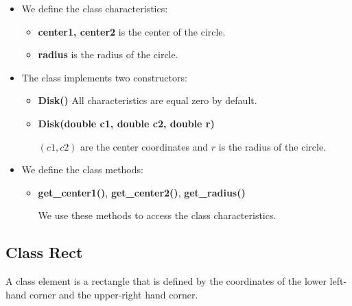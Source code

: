 \documentclass{report}
\begin{document}
	\begin{itemize}
		\item We define the class characteristics: 
		\begin{itemize}
			\item {\bfseries center1, center2}  is the center of the circle.
		
			\item {\bfseries radius}  is  the radius of the circle.
		\end{itemize}
	
		\item The class implements two constructors:
		\begin{itemize}
			\item {\bfseries Disk()} All characteristics are equal zero by default. 
		
			\item {\bfseries Disk(double c1, double c2, double r)}
		
			$(c1, c2)$ are the center coordinates and $r$ is  the radius of the circle. 
		\end{itemize}
	
		\item We define the class methods:
	
		\begin{itemize}
			\item {\bfseries get\_center1()}, {\bfseries get\_center2()}, {\bfseries get\_radius()}
			
			We use these  methods to access the class characteristics.
		\end{itemize}
	\end{itemize}
	
	\subsection*{Class Rect}
	\label{Rect}
	
	A class element is a rectangle that is defined by the coordinates of the lower left-hand corner and the upper-right hand corner.
		
\end{document}
